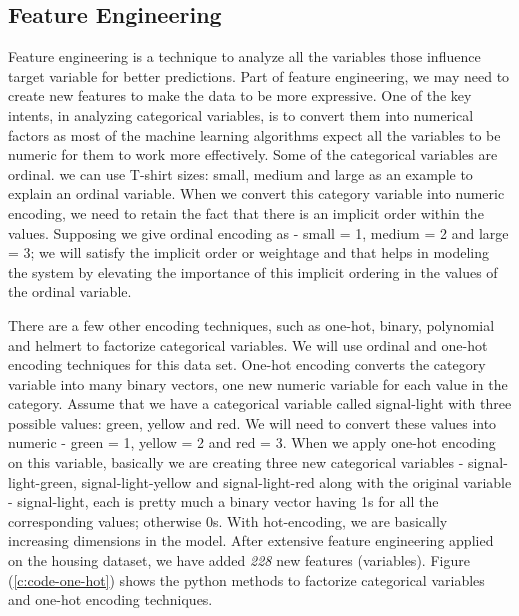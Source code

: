 \documentclass[sigconf]{acmart}
\begin{document}
	\subsection{Feature Engineering}
	
	Feature engineering is a technique to analyze all the variables those influence target variable for better predictions. Part of feature engineering, we may need to create new features to make the data to be more expressive. One of the key intents, in analyzing categorical variables, is to convert them into numerical factors as most of the machine learning algorithms expect all the variables to be numeric for them to work more effectively. Some of the categorical variables are ordinal. we can use T-shirt sizes: small, medium and large as an example to explain an ordinal variable. When we convert this category variable into numeric encoding, we need to retain the fact that there is an implicit order within the values. Supposing we give ordinal encoding as - small = 1, medium = 2 and large = 3; we will satisfy the implicit order or weightage and that helps in modeling the system by elevating the importance of this implicit ordering in the values of the ordinal variable.
	
	There are a few other encoding techniques, such as one-hot, binary, polynomial and helmert to factorize categorical variables. We will use ordinal and one-hot encoding techniques for this data set. One-hot encoding converts the category variable into many binary vectors, one new numeric variable for each value in the category. Assume that we have a categorical variable called signal-light with three possible values: green, yellow and red. We will need to convert these values into numeric - green = 1, yellow = 2 and red = 3. When we apply one-hot encoding on this variable, basically we are creating three new categorical variables - signal-light-green, signal-light-yellow and signal-light-red along with the original variable - signal-light, each is pretty much a binary vector having 1s for all the corresponding values; otherwise 0s. With hot-encoding, we are basically increasing dimensions in the model. After extensive feature engineering applied on the housing dataset, we have added {\em 228} new features (variables). Figure (\ref{c:code-one-hot}) shows the python methods to factorize categorical variables and one-hot encoding techniques. 
	
\end{document}

